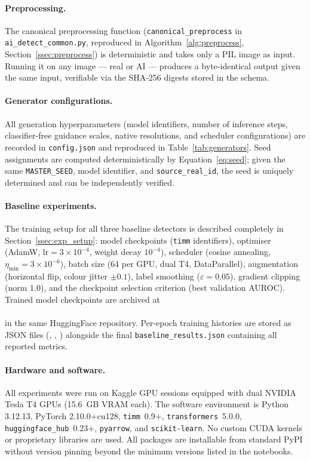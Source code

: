 \paragraph{Preprocessing.}
The canonical preprocessing function
(\texttt{canonical\_preprocess} in \texttt{ai\_detect\_common.py},
reproduced in Algorithm~\ref{alg:preprocess}, Section~\ref{ssec:preprocess}) is deterministic and
takes only a PIL image as input.
Running it on any image — real or AI — produces a byte-identical
output given the same input, verifiable via the SHA-256 digests
stored in the schema.

\paragraph{Generator configurations.}
All generation hyperparameters (model identifiers, number of
inference steps, classifier-free guidance scales, native resolutions,
and scheduler configurations) are recorded in \texttt{config.json}
and reproduced in Table~\ref{tab:generators}.
Seed assignments are computed deterministically by
Equation~\ref{eq:seed}; given the same \texttt{MASTER\_SEED}, model
identifier, and \texttt{source\_real\_id}, the seed is uniquely
determined and can be independently verified.

\paragraph{Baseline experiments.}
The training setup for all three baseline detectors is described
completely in Section~\ref{ssec:exp_setup}: model checkpoints
(\texttt{timm} identifiers), optimiser (AdamW,
$\text{lr} = 3 \times 10^{-4}$, weight decay $10^{-4}$),
scheduler (cosine annealing, $\eta_{\min} = 3 \times 10^{-6}$),
batch size (64 per GPU, dual T4, DataParallel),
augmentation (horizontal flip, colour jitter $\pm 0.1$),
label smoothing ($\varepsilon = 0.05$), gradient clipping (norm 1.0),
and the checkpoint selection criterion (best validation AUROC).
Trained model checkpoints are archived at\\
\\
in the same HuggingFace repository.
Per-epoch training histories are stored as JSON files
(, ,
) alongside the final
\texttt{baseline\_results.json} containing all reported metrics.

\paragraph{Hardware and software.}
All experiments were run on Kaggle GPU sessions equipped with dual
NVIDIA Tesla T4 GPUs (15.6~GB VRAM each).
The software environment is Python 3.12.13, PyTorch 2.10.0+cu128,
\texttt{timm}~0.9+, \texttt{transformers}~5.0.0,
\texttt{huggingface\_hub}~0.23+, \texttt{pyarrow}, and
\texttt{scikit-learn}.
No custom CUDA kernels or proprietary libraries are used.
All packages are installable from standard PyPI without version pinning
beyond the minimum versions listed in the notebooks.

